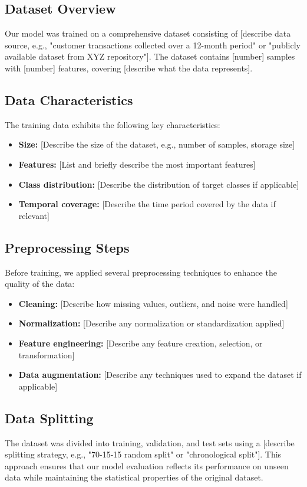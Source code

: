 \documentclass{article}
\begin{document}
\subsection{Dataset Overview}
Our model was trained on a comprehensive dataset consisting of [describe data source, e.g., "customer transactions collected over a 12-month period" or "publicly available dataset from XYZ repository"]. The dataset contains [number] samples with [number] features, covering [describe what the data represents].

\subsection{Data Characteristics}
The training data exhibits the following key characteristics:
\begin{itemize}
    \item \textbf{Size:} [Describe the size of the dataset, e.g., number of samples, storage size]
    \item \textbf{Features:} [List and briefly describe the most important features]
    \item \textbf{Class distribution:} [Describe the distribution of target classes if applicable]
    \item \textbf{Temporal coverage:} [Describe the time period covered by the data if relevant]
\end{itemize}

\subsection{Preprocessing Steps}
Before training, we applied several preprocessing techniques to enhance the quality of the data:
\begin{itemize}
    \item \textbf{Cleaning:} [Describe how missing values, outliers, and noise were handled]
    \item \textbf{Normalization:} [Describe any normalization or standardization applied]
    \item \textbf{Feature engineering:} [Describe any feature creation, selection, or transformation]
    \item \textbf{Data augmentation:} [Describe any techniques used to expand the dataset if applicable]
\end{itemize}

\subsection{Data Splitting}
The dataset was divided into training, validation, and test sets using a [describe splitting strategy, e.g., "70-15-15 random split" or "chronological split"]. This approach ensures that our model evaluation reflects its performance on unseen data while maintaining the statistical properties of the original dataset.
\end{document}
